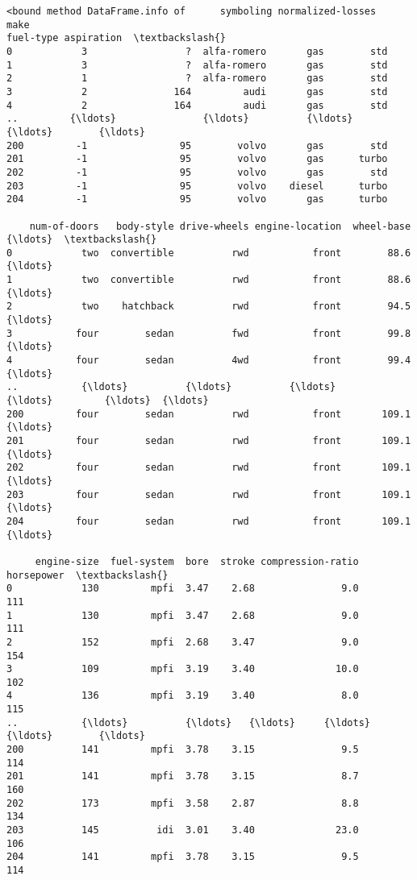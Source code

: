 \documentclass[11pt]{article}
\makeatletter
\newcommand{\boxspacing}{\kern\kvtcb@left@rule\kern\kvtcb@boxsep}
\newcommand{\prompt}[4]{
        \ttfamily\llap{{\color{#2}[#3]:\hspace{3pt}#4}}\vspace{-\baselineskip}
    }
\makeatother
\begin{document}
            \begin{tcolorbox}[breakable, size=fbox, boxrule=.5pt, pad at break*=1mm, opacityfill=0]
\prompt{Out}{outcolor}{23}{\boxspacing}
\begin{Verbatim}[commandchars=\\\{\}]
<bound method DataFrame.info of      symboling normalized-losses         make
fuel-type aspiration  \textbackslash{}
0            3                 ?  alfa-romero       gas        std
1            3                 ?  alfa-romero       gas        std
2            1                 ?  alfa-romero       gas        std
3            2               164         audi       gas        std
4            2               164         audi       gas        std
..         {\ldots}               {\ldots}          {\ldots}       {\ldots}        {\ldots}
200         -1                95        volvo       gas        std
201         -1                95        volvo       gas      turbo
202         -1                95        volvo       gas        std
203         -1                95        volvo    diesel      turbo
204         -1                95        volvo       gas      turbo

    num-of-doors   body-style drive-wheels engine-location  wheel-base  {\ldots}  \textbackslash{}
0            two  convertible          rwd           front        88.6  {\ldots}
1            two  convertible          rwd           front        88.6  {\ldots}
2            two    hatchback          rwd           front        94.5  {\ldots}
3           four        sedan          fwd           front        99.8  {\ldots}
4           four        sedan          4wd           front        99.4  {\ldots}
..           {\ldots}          {\ldots}          {\ldots}             {\ldots}         {\ldots}  {\ldots}
200         four        sedan          rwd           front       109.1  {\ldots}
201         four        sedan          rwd           front       109.1  {\ldots}
202         four        sedan          rwd           front       109.1  {\ldots}
203         four        sedan          rwd           front       109.1  {\ldots}
204         four        sedan          rwd           front       109.1  {\ldots}

     engine-size  fuel-system  bore  stroke compression-ratio horsepower  \textbackslash{}
0            130         mpfi  3.47    2.68               9.0        111
1            130         mpfi  3.47    2.68               9.0        111
2            152         mpfi  2.68    3.47               9.0        154
3            109         mpfi  3.19    3.40              10.0        102
4            136         mpfi  3.19    3.40               8.0        115
..           {\ldots}          {\ldots}   {\ldots}     {\ldots}               {\ldots}        {\ldots}
200          141         mpfi  3.78    3.15               9.5        114
201          141         mpfi  3.78    3.15               8.7        160
202          173         mpfi  3.58    2.87               8.8        134
203          145          idi  3.01    3.40              23.0        106
204          141         mpfi  3.78    3.15               9.5        114


\end{Verbatim}
\end{tcolorbox}
\end{document}
